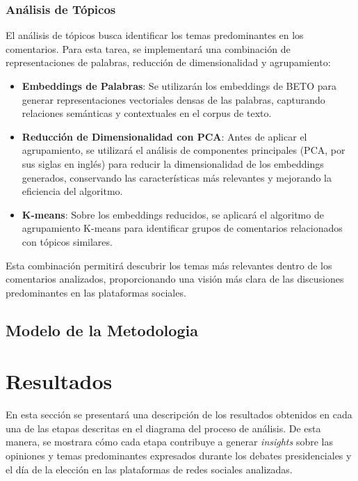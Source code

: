 \documentclass[10pt, a4paper]{article}
\begin{document}
	
	
	\subsubsection{Análisis de Tópicos}
	
	El análisis de tópicos busca identificar los temas predominantes en los comentarios. Para esta tarea, se implementará una combinación de representaciones de palabras, reducción de dimensionalidad y agrupamiento:
	
	\begin{itemize}
		\item \textbf{Embeddings de Palabras}: Se utilizarán los embeddings de BETO para generar representaciones vectoriales densas de las palabras, capturando relaciones semánticas y contextuales en el corpus de texto.
		\item \textbf{Reducción de Dimensionalidad con PCA}: Antes de aplicar el agrupamiento, se utilizará el análisis de componentes principales (PCA, por sus siglas en inglés) para reducir la dimensionalidad de los embeddings generados, conservando las características más relevantes y mejorando la eficiencia del algoritmo.
		\item \textbf{K-means}: Sobre los embeddings reducidos, se aplicará el algoritmo de agrupamiento K-means para identificar grupos de comentarios relacionados con tópicos similares.
	\end{itemize}
	
	Esta combinación permitirá descubrir los temas más relevantes dentro de los comentarios analizados, proporcionando una visión más clara de las discusiones predominantes en las plataformas sociales.
	
	\subsection{Modelo de la Metodologia}
	
	
	\section{Resultados}
	
	En esta sección se presentará una descripción de los resultados obtenidos en cada una de las etapas descritas en el diagrama del proceso de análisis. De esta manera, se mostrara cómo cada etapa contribuye a generar \textit{insights} sobre las opiniones y temas predominantes expresados durante los debates presidenciales y el día de la elección en las plataformas de redes sociales analizadas.
	
\end{document}
